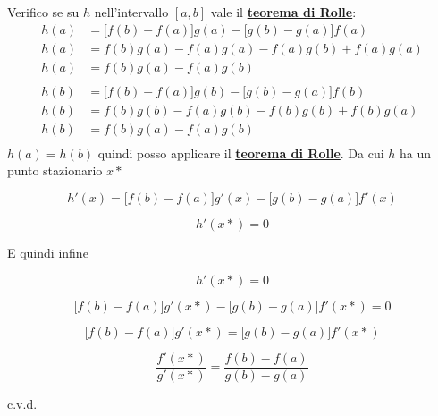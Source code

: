 \documentclass[../dimostrazioni]{subfiles}
\begin{document}
            Verifico se su \(h\) nell'intervallo \([a,b]\) vale il \textbf{\hyperref[teoRolle]{teorema di Rolle}}:
            \begin{align*}
                h(a)&=\big[f(b) - f(a)\big]g(a) - \big[g(b) - g(a)\big]f(a)\\
                h(a)&=f(b)g(a) - f(a)g(a) - f(a)g(b) + f(a)g(a)\\
                h(a)&=f(b)g(a) - f(a)g(b)\\
                \\
                h(b)&=\big[f(b) - f(a)\big]g(b) - \big[g(b) - g(a)\big]f(b)\\
                h(b)&=f(b)g(b) - f(a)g(b) - f(b)g(b) + f(b)g(a)\\
                h(b)&=f(b)g(a) - f(a)g(b)\\
            \end{align*}
            \(h(a)=h(b)\) quindi posso applicare il \textbf{\hyperref[teoRolle]{teorema di Rolle}}. Da cui \(h\) ha un punto stazionario \(x*\)

            \[    h'(x) = \big[f(b) - f(a)\big]g'(x) - \big[g(b) - g(a)\big]f'(x) \]
            
            \[    h'(x*) = 0 \]

            E quindi infine

            \[  h'(x*) = 0 \]
            
            \[  \big[f(b) - f(a)\big]g'(x*) - \big[g(b) - g(a)\big]f'(x*) = 0 \]

            \[  \big[f(b) - f(a)\big]g'(x*) = \big[g(b) - g(a)\big]f'(x*) \]
            
            \[  \frac{ f'(x*) }{ g'(x*) } = \frac{ f(b) - f(a) }{ g(b) - g(a) } \]
            
            c.v.d.
\end{document}
